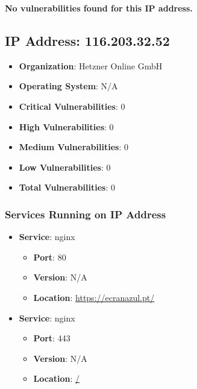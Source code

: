 \documentclass{article}
\begin{document}
\textbf{No vulnerabilities found for this IP address.}




\clearpage



\subsection{IP Address: 116.203.32.52}

\begin{itemize}
    \item \textbf{Organization}: Hetzner Online GmbH
    \item \textbf{Operating System}:  N/A 
    \item \textbf{Critical Vulnerabilities}: 0
    \item \textbf{High Vulnerabilities}: 0
    \item \textbf{Medium Vulnerabilities}: 0
    \item \textbf{Low Vulnerabilities}: 0
    \item \textbf{Total Vulnerabilities}: 0
\end{itemize}

\subsubsection*{Services Running on IP Address}

\begin{itemize}
    
        \item \textbf{Service}: nginx
        \begin{itemize}
            \item \textbf{Port}: 80
            \item \textbf{Version}:  N/A 
            \item \textbf{Location}: \href{ https://ecranazul.pt/ }{ https://ecranazul.pt/ }
        \end{itemize}
    
        \item \textbf{Service}: nginx
        \begin{itemize}
            \item \textbf{Port}: 443
            \item \textbf{Version}:  N/A 
            \item \textbf{Location}: \href{ / }{ / }
        \end{itemize}
    
\end{itemize}
\end{document}

